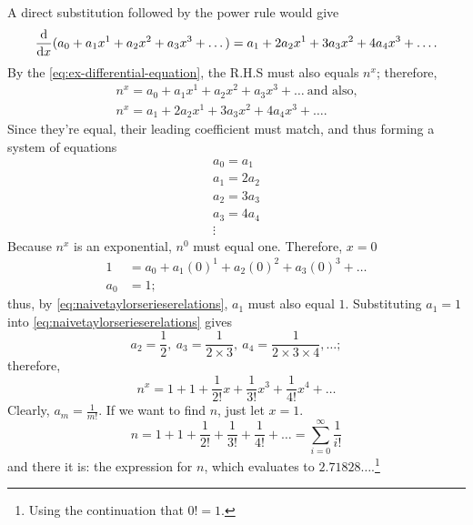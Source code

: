 A direct substitution followed by the power rule would give
\begin{equation}
  \odv*{(a_0 + a_1x^1 + a_2x^2 + a_3x^3 + \dots)}{x} = a_1 + 2a_2x^1 + 3a_3x^2 + 4a_4x^3 + \dots.
\end{equation}
By the \cref{eq:ex-differential-equation}, the R.H.S must also equals $n^x$; therefore,
\begin{equation}
  \begin{multlined}
    n^x = a_0 + a_1x^1 + a_2x^2 + a_3x^3 + \dots ~\textrm{and also,} \\
    n^x = a_1 + 2a_2x^1 + 3a_3x^2 + 4a_4x^3 + \dots.
  \end{multlined}
\end{equation}
Since they're equal, their leading coefficient must match, and thus forming a system of equations
\begin{equation}
  \begin{array}{c}
    a_0 = a_1 \\ a_1 = 2a_2 \\ a_2 = 3a_3 \\ a_3 = 4a_4 \\ \vdots
  \end{array}\label{eq:naivetaylorserieserelations}
\end{equation}
Because $n^x$ is an exponential, $n^0$ must equal one. Therefore, $x = 0$
\begin{align*}
  1   & = a_0 + a_1(0)^1 + a_2(0)^2 + a_3(0)^3 + \dots \\
  a_0 & = 1;
\end{align*}
thus, by \cref{eq:naivetaylorserieserelations}, $a_1$ must also equal $1$. Substituting $a_1 = 1$ into \cref{eq:naivetaylorserieserelations} gives
\begin{equation}
  a_2 = \frac{1}{2},~a_3 = \frac{1}{2 \times 3},~a_4 = \frac{1}{2 \times 3 \times 4}, \dots;
\end{equation}
therefore,
\begin{equation*}
  n^x = 1 + 1 + \frac{1}{2!}x + \frac{1}{3!}x^3 + \frac{1}{4!}x^4 + \dots
\end{equation*}
Clearly, $a_m = \frac{1}{m!}$. If we want to find $n$, just let $x = 1$.
\begin{equation*}
  n = 1 + 1 + \frac{1}{2!} + \frac{1}{3!} + \frac{1}{4!} + \dots = \sum_{i = 0}^{\infty}\frac{1}{i!}
\end{equation*}
and there it is: the expression for $n$, which evaluates to $2.71828\dots$.\footnote{Using the continuation that $0! = 1$.}

